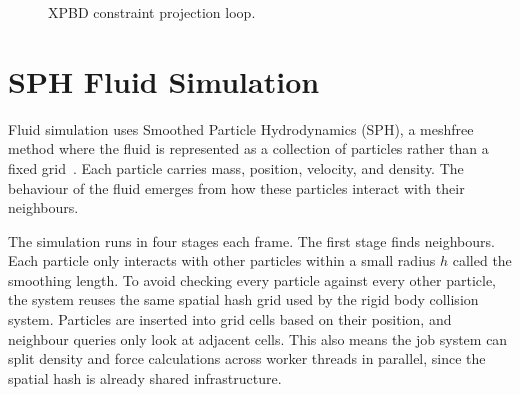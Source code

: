 \documentclass[9pt,openany]{extbook}
\begin{document}
\begin{figure}[H]
\centering
{}
\caption{XPBD constraint projection loop.}
\label{fig:xpbd_pipeline}
\end{figure}

\section{SPH Fluid Simulation}

Fluid simulation uses Smoothed Particle Hydrodynamics (SPH), a meshfree method where the fluid is represented as a collection of particles rather than a fixed grid~\cite{muller2003sph,ihmsen2014sph}. Each particle carries mass, position, velocity, and density. The behaviour of the fluid emerges from how these particles interact with their neighbours.

The simulation runs in four stages each frame. The first stage finds neighbours. Each particle only interacts with other particles within a small radius $h$ called the smoothing length. To avoid checking every particle against every other particle, the system reuses the same spatial hash grid used by the rigid body collision system. Particles are inserted into grid cells based on their position, and neighbour queries only look at adjacent cells. This also means the job system can split density and force calculations across worker threads in parallel, since the spatial hash is already shared infrastructure.
\end{document}
